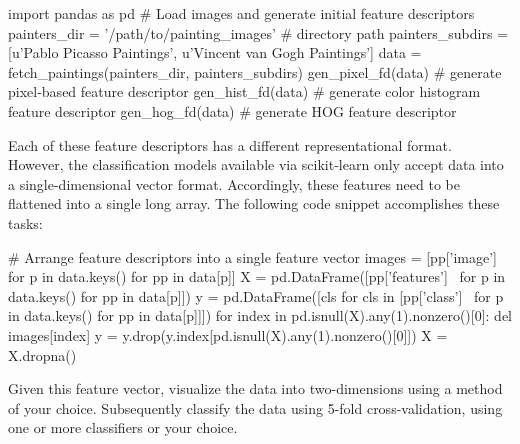 \documentclass[paper=a4, fontsize=11pt]{scrartcl} %
\numberwithin{equation}{section} %
\numberwithin{figure}{section} %
\numberwithin{table}{section} %
\begin{document}
\vspace{6pt}

\begin{adjustbox}{minipage=0.8\textwidth,margin=0pt \smallskipamount,center}
\begin{python}
import pandas as pd
# Load images and generate initial feature descriptors
painters_dir = '/path/to/painting_images' # directory path
painters_subdirs = [u'Pablo Picasso Paintings',
                    u'Vincent van Gogh Paintings']
data = fetch_paintings(painters_dir, painters_subdirs)
gen_pixel_fd(data) # generate pixel-based feature descriptor
gen_hist_fd(data) # generate color histogram feature descriptor
gen_hog_fd(data) # generate HOG feature descriptor
\end{python}
\end{adjustbox}

\vspace{6pt}

Each of these feature descriptors has a different representational format. However, the classification models available via scikit-learn only accept data into a single-dimensional vector format. Accordingly, these features need to be flattened into a single long array. The following code snippet accomplishes these tasks:

\vspace{6pt}

\begin{adjustbox}{minipage=0.8\textwidth,margin=0pt \smallskipamount,center}
\begin{python}
# Arrange feature descriptors into a single feature vector
images = [pp['image'] for p in data.keys() for pp in data[p]]
X = pd.DataFrame([pp['features'] \
               for p in data.keys() for pp in data[p]])
y = pd.DataFrame([cls for cls in [pp['class'] \
               for p in data.keys() for pp in data[p]]])
for index in pd.isnull(X).any(1).nonzero()[0]: del images[index]
y = y.drop(y.index[pd.isnull(X).any(1).nonzero()[0]])
X = X.dropna()
\end{python}
\end{adjustbox}

\vspace{6pt}

Given this feature vector, visualize the data into two-dimensions using a method of your choice. Subsequently classify the data using 5-fold cross-validation, using one or more classifiers or your choice.

\vspace{8pt}
\end{document}
